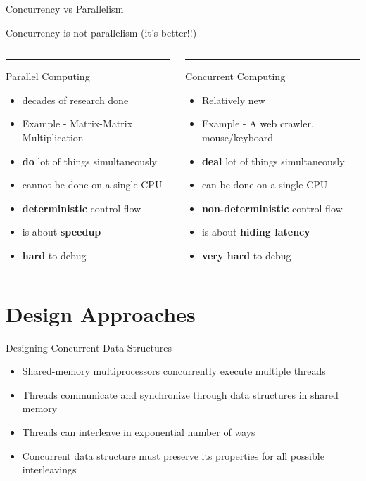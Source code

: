 \documentclass{beamer}
\begin{document}
\begin{frame}{Concurrency vs Parallelism}
\begin{center}
\Large {\color{blue}Concurrency} is not {\color{red}parallelism} (it's better!!)
\end{center}
\pause
\begin{columns}
\begin{column}[t]{0.48\textwidth}
\color{red}\rule{\linewidth}{4pt}
Parallel Computing
\begin{itemize}
\item decades of research done
\item Example - Matrix-Matrix Multiplication
\item \textbf{do} lot of things simultaneously
\item cannot be done on a single CPU
\item \textbf{deterministic} control flow
\item is about \textbf{speedup}
\item \textbf{hard} to debug
\end{itemize}
\end{column}
\begin{column}[t]{0.48\textwidth}
\color{blue}\rule{\linewidth}{4pt}
Concurrent Computing
\begin{itemize}
\item Relatively new
\item Example - A web crawler, mouse/keyboard
\item \textbf{deal} lot of things simultaneously
\item can be done on a single CPU
\item \textbf{non-deterministic} control flow
\item is about \textbf{hiding latency}
\item \textbf{very hard} to debug
\end{itemize}
\end{column}
\end{columns}
\end{frame}

\section{Design Approaches}
\begin{frame}{Designing Concurrent Data Structures}
\begin{itemize}
\item Shared-memory multiprocessors concurrently execute multiple threads
\item Threads communicate and synchronize through data structures in shared memory
\item Threads can interleave in exponential number of ways
\item Concurrent data structure must preserve its properties for all possible interleavings
\end{itemize}
\end{frame}
\end{document}
